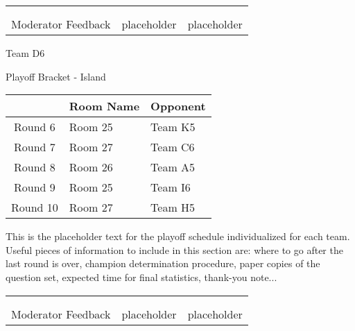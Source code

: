 \documentclass{article}%
\begin{document}
\newline%
%
\begin{tabularx}{\textwidth}{YYY}%
  &  &  \\%
\\%
Moderator Feedback&placeholder&placeholder\\%
\end{tabularx}%
\newpage%
\begin{center}%
\begin{Huge}%
Team D6%
\end{Huge}%
\vspace*{12pt}%
\linebreak%
\begin{Large}%
Playoff Bracket {-} Island%
\end{Large}%
\end{center}%
\vspace*{4pt}%
%
\begin{tabularx}{\textwidth}{|c|Y|Y|}%
\hline%
&Room Name&Opponent\\%
\hline%
Round 6&Room 25&Team K5\\%
Round 7&Room 27&Team C6\\%
Round 8&Room 26&Team A5\\%
Round 9&Room 25&Team I6\\%
Round 10&Room 27&Team H5\\%
\hline%
\end{tabularx}%
\vspace*{30pt}%
\linebreak%
This is the placeholder text for the playoff schedule individualized for each team. Useful pieces of information to include in this section are: where to go after the last round is over, champion determination procedure, paper copies of the question set, expected time for final statistics, thank{-}you note...%
\vspace*{30pt}%
\newline%
%
\begin{tabularx}{\textwidth}{YYY}%
  &  &  \\%
\\%
Moderator Feedback&placeholder&placeholder\\%
\end{tabularx}%
\end{document}
